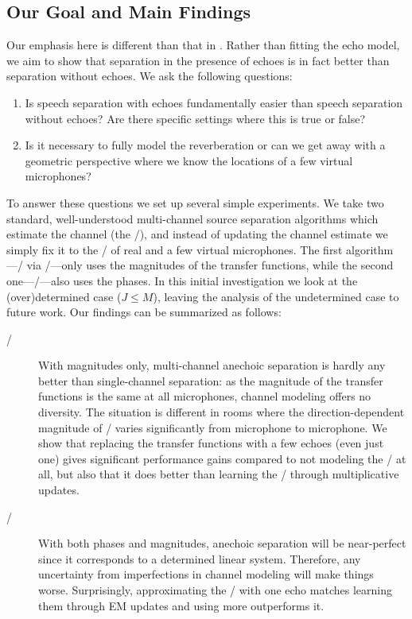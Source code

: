 \subsection{Our Goal and Main Findings}

Our emphasis here is different than that in .
Rather than fitting the echo model, we aim to show that separation in the presence of echoes is in fact better than separation without echoes.
We ask the following questions:
\begin{enumerate}
    \item Is speech separation with echoes fundamentally easier than speech separation without echoes?
    Are there specific settings where this is true or false?
    \item Is it necessary to fully model the reverberation or can we get away with a geometric perspective where we know the locations of a few virtual microphones?
\end{enumerate}
To answer these questions we set up several simple experiments.
We take two standard, well-understood multi-channel source separation algorithms which estimate the channel (the \RTFs/),
and instead of updating the channel estimate we simply fix it to the \RTFs/ of real and a few virtual microphones.
The first algorithm---\NMFdef/ via \MU/---only uses the magnitudes of the transfer functions, while the second one---\EMdef/---also uses the phases.
In this initial investigation we look at the (over)determined case ($J \leq M$),
leaving the analysis of the undetermined case to future work. Our findings can be summarized as follows:
\begin{description}
    \item[\MU/] With magnitudes only, multi-channel anechoic separation is hardly any better than single-channel separation:
    as the magnitude of the transfer functions is the same at all microphones, channel modeling offers no diversity.
    The situation is different in rooms where the direction-dependent magnitude of \RTFs/ varies significantly from microphone to microphone.
    We show that replacing the transfer functions with a few echoes (even just one) gives significant performance gains compared to not modeling the \RTFs/ at all,
    but also that it does better than learning the \RTFs/ through multiplicative updates.
    \item[\EM/] With both phases and magnitudes, anechoic separation will be near-perfect since it corresponds to a determined linear system.
    Therefore, any uncertainty from imperfections in channel modeling will make things worse.
    Surprisingly, approximating the \RTFs/ with one echo matches learning them through EM updates and using more outperforms it.
\end{description}

